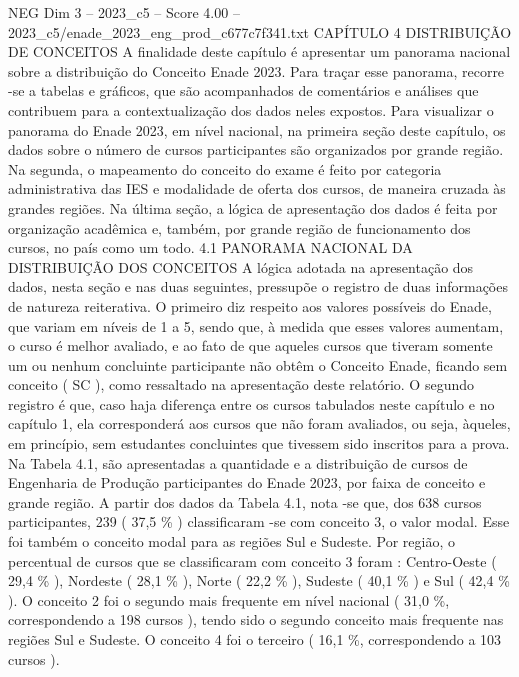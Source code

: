 \begin{textsample}{NEG Dim 3 – 2023\_c5 – Score 4.00 – 2023\_c5/enade\_2023\_eng\_prod\_c677c7f341.txt}  \label{ex:f3_neg_230}
CAPÍTULO 4 DISTRIBUIÇÃO DE CONCEITOS A finalidade deste capítulo é apresentar um panorama nacional sobre a distribuição do Conceito Enade 2023.
Para traçar esse panorama, recorre -se a tabelas e gráficos, que são acompanhados de comentários e análises que contribuem para a contextualização dos dados neles expostos.
Para visualizar o panorama do Enade 2023, em nível nacional, na primeira seção deste capítulo, os dados sobre o número de cursos participantes são organizados por grande região.
Na segunda, o mapeamento do conceito do exame é feito por categoria administrativa das IES e modalidade de oferta dos cursos, de maneira cruzada às grandes regiões.
Na última seção, a lógica de apresentação dos dados é feita por organização acadêmica e, também, por grande região de funcionamento dos cursos, no país como um todo. 4.1 PANORAMA NACIONAL DA DISTRIBUIÇÃO DOS CONCEITOS A lógica adotada na apresentação dos dados, nesta seção e nas duas seguintes, pressupõe o registro de duas informações de natureza reiterativa.
O primeiro diz respeito aos valores possíveis do Enade, que variam em níveis de 1 a 5, sendo que, à medida que esses valores aumentam, o curso é melhor avaliado, e ao fato de que aqueles cursos que tiveram somente um ou nenhum concluinte participante não obtêm o Conceito Enade, ficando sem conceito ( SC ), como ressaltado na apresentação deste relatório.
O segundo registro é que, caso haja diferença entre os cursos tabulados neste capítulo e no capítulo 1, ela corresponderá aos cursos que não foram avaliados, ou seja, àqueles, em princípio, sem estudantes concluintes que tivessem sido inscritos para a prova.
Na Tabela 4.1, são apresentadas a quantidade e a distribuição de cursos de Engenharia de Produção participantes do Enade 2023, por faixa de conceito e grande região.
A partir dos dados da Tabela 4.1, nota -se que, dos 638 cursos participantes, 239 ( 37,5 \% ) classificaram -se com conceito 3, o valor modal.
Esse foi também o conceito modal para as regiões Sul e Sudeste.
Por região, o percentual de cursos que se classificaram com conceito 3 foram : Centro-Oeste ( 29,4 \% ), Nordeste ( 28,1 \% ), Norte ( 22,2 \% ), Sudeste ( 40,1 \% ) e Sul ( 42,4 \% ).
O conceito 2 foi o segundo mais frequente em nível nacional ( 31,0 \%, correspondendo a 198 cursos ), tendo sido o segundo conceito mais frequente nas regiões Sul e Sudeste.
O conceito 4 foi o terceiro ( 16,1 \%, correspondendo a 103 cursos ).

\end{textsample}
